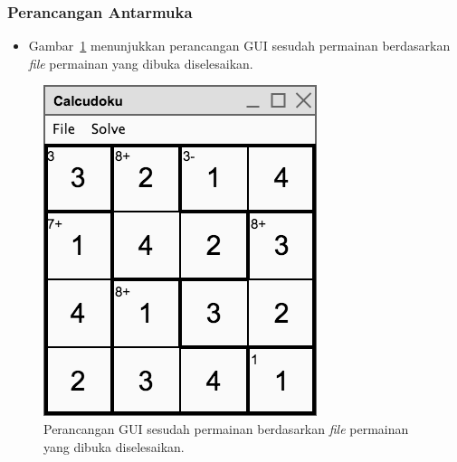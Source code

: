 \documentclass{beamer}
\begin{document}
\begin{frame}
\frametitle{Perancangan Antarmuka}
\begin{itemize}
\item Gambar~\ref{fig:perancangangui3} menunjukkan perancangan GUI sesudah permainan berdasarkan \textit{file} permainan yang dibuka diselesaikan.
\end{itemize}
\begin{figure}
\centering
\captionsetup{justification=centering}
\includegraphics[scale=0.4]{Gambar/Perancangan/PerancanganGUI3.png}
\caption[Perancangan GUI sesudah permainan berdasarkan \textit{file} permainan yang dibuka diselesaikan.]{Perancangan GUI sesudah permainan berdasarkan \textit{file} permainan yang dibuka diselesaikan.}
\label{fig:perancangangui3}
\end{figure}
\end{frame}

\end{document}
